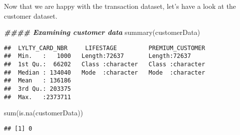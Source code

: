 \documentclass[
]{article}
\newenvironment{Shaded}{\begin{snugshade}}{\end{snugshade}}
\newcommand{\AttributeTok}[1]{\textcolor[rgb]{0.77,0.63,0.00}{#1}}
\newcommand{\ConstantTok}[1]{\textcolor[rgb]{0.00,0.00,0.00}{#1}}
\newcommand{\DecValTok}[1]{\textcolor[rgb]{0.00,0.00,0.81}{#1}}
\newcommand{\DocumentationTok}[1]{\textcolor[rgb]{0.56,0.35,0.01}{\textbf{\textit{#1}}}}
\newcommand{\FloatTok}[1]{\textcolor[rgb]{0.00,0.00,0.81}{#1}}
\newcommand{\FunctionTok}[1]{\textcolor[rgb]{0.00,0.00,0.00}{#1}}
\newcommand{\NormalTok}[1]{#1}
\newcommand{\OtherTok}[1]{\textcolor[rgb]{0.56,0.35,0.01}{#1}}
\newcommand{\SpecialCharTok}[1]{\textcolor[rgb]{0.00,0.00,0.00}{#1}}
\newcommand{\StringTok}[1]{\textcolor[rgb]{0.31,0.60,0.02}{#1}}
\begin{document}
Now that we are happy with the transaction dataset, let's have a look at
the customer dataset.

\begin{Shaded}
\begin{Highlighting}[]
\DocumentationTok{\#\#\#\# Examining customer data}
\FunctionTok{summary}\NormalTok{(customerData)}
\end{Highlighting}
\end{Shaded}

\begin{verbatim}
##  LYLTY_CARD_NBR     LIFESTAGE         PREMIUM_CUSTOMER  
##  Min.   :   1000   Length:72637       Length:72637      
##  1st Qu.:  66202   Class :character   Class :character  
##  Median : 134040   Mode  :character   Mode  :character  
##  Mean   : 136186                                        
##  3rd Qu.: 203375                                        
##  Max.   :2373711
\end{verbatim}

\begin{Shaded}
\begin{Highlighting}[]
\FunctionTok{sum}\NormalTok{(}\FunctionTok{is.na}\NormalTok{(customerData))}
\end{Highlighting}
\end{Shaded}

\begin{verbatim}
## [1] 0
\end{verbatim}

\begin{Shaded}
\end{Shaded}
\end{document}
